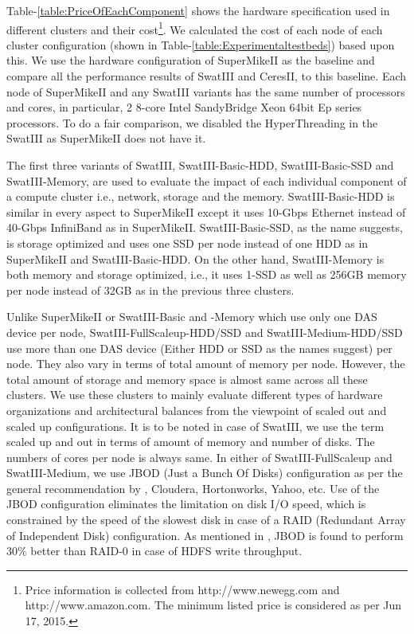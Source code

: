 \documentclass[conference]{IEEEtran}
\begin{document}
Table-\ref{table:PriceOfEachComponent} shows the hardware specification used in different clusters and their cost\footnote{Price information is collected from http://www.newegg.com and http://www.amazon.com. The minimum listed price is considered as per Jun 17, 2015.}. We calculated the cost of each node of each cluster configuration (shown in Table-\ref{table:Experimentaltestbeds}) based upon  this. We use the hardware configuration of SuperMikeII as the baseline and compare all the performance results of SwatIII and CeresII, to this baseline. Each node of SuperMikeII and any SwatIII variants has the same number of processors and cores, in particular, 2 8-core Intel SandyBridge Xeon 64bit Ep series processors. To do a fair comparison, we disabled the HyperThreading in the SwatIII as SuperMikeII does not have it. 
 
The first three variants of SwatIII, SwatIII-Basic-HDD, SwatIII-Basic-SSD and SwatIII-Memory, are used to evaluate the impact of each individual component of a compute cluster i.e., network, storage and the memory. SwatIII-Basic-HDD is similar in every aspect to SuperMikeII except it uses 10-Gbps Ethernet instead of 40-Gbps InfiniBand as in SuperMikeII. SwatIII-Basic-SSD, as the name suggests, is storage optimized and uses one SSD per node instead of one HDD as in SuperMikeII and SwatIII-Basic-HDD. On the other hand, SwatIII-Memory is both memory and storage optimized, i.e., it uses 1-SSD as well as 256GB memory per node instead of 32GB as in the previous three clusters. 

Unlike SuperMikeII or SwatIII-Basic and -Memory which use only one DAS device per node, SwatIII-FullScaleup-HDD/SSD and SwatIII-Medium-HDD/SSD use more than one DAS device (Either HDD or SSD as the names suggest) per node. They also vary in terms of total amount of memory per node. However, the total amount of storage and memory space is almost same across all these clusters. We use these clusters to mainly evaluate different types of hardware organizations and architectural balances from the viewpoint of scaled out and scaled up configurations. It is to be noted in case of SwatIII, we use the term scaled up and out in terms of amount of memory and number of disks. The numbers of cores per node is always same. In either of SwatIII-FullScaleup and SwatIII-Medium, we use JBOD (Just a Bunch Of Disks) configuration as per the general recommendation by \cite{fw:hadoop}, Cloudera, Hortonworks, Yahoo, etc. Use of the JBOD configuration eliminates the limitation on disk I/O speed, which is constrained by the speed of the slowest disk in case of a RAID (Redundant Array of Independent Disk) configuration. As mentioned in \cite{fw:hadoop}, JBOD is found to perform 30\% better than RAID-0 in case of HDFS write throughput. 
\end{document}
